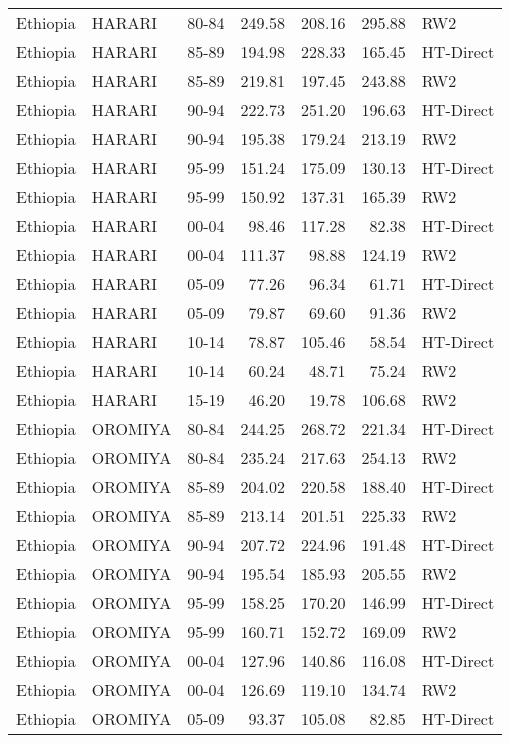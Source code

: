 \begin{longtable}{lllrrrl}
  Ethiopia & HARARI & 80-84 & 249.58 & 208.16 & 295.88 & RW2 \\ 
  Ethiopia & HARARI & 85-89 & 194.98 & 228.33 & 165.45 & HT-Direct \\ 
  Ethiopia & HARARI & 85-89 & 219.81 & 197.45 & 243.88 & RW2 \\ 
  Ethiopia & HARARI & 90-94 & 222.73 & 251.20 & 196.63 & HT-Direct \\ 
  Ethiopia & HARARI & 90-94 & 195.38 & 179.24 & 213.19 & RW2 \\ 
  Ethiopia & HARARI & 95-99 & 151.24 & 175.09 & 130.13 & HT-Direct \\ 
  Ethiopia & HARARI & 95-99 & 150.92 & 137.31 & 165.39 & RW2 \\ 
  Ethiopia & HARARI & 00-04 & 98.46 & 117.28 & 82.38 & HT-Direct \\ 
  Ethiopia & HARARI & 00-04 & 111.37 & 98.88 & 124.19 & RW2 \\ 
  Ethiopia & HARARI & 05-09 & 77.26 & 96.34 & 61.71 & HT-Direct \\ 
  Ethiopia & HARARI & 05-09 & 79.87 & 69.60 & 91.36 & RW2 \\ 
  Ethiopia & HARARI & 10-14 & 78.87 & 105.46 & 58.54 & HT-Direct \\ 
  Ethiopia & HARARI & 10-14 & 60.24 & 48.71 & 75.24 & RW2 \\ 
  Ethiopia & HARARI & 15-19 & 46.20 & 19.78 & 106.68 & RW2 \\ 
  Ethiopia & OROMIYA & 80-84 & 244.25 & 268.72 & 221.34 & HT-Direct \\ 
  Ethiopia & OROMIYA & 80-84 & 235.24 & 217.63 & 254.13 & RW2 \\ 
  Ethiopia & OROMIYA & 85-89 & 204.02 & 220.58 & 188.40 & HT-Direct \\ 
  Ethiopia & OROMIYA & 85-89 & 213.14 & 201.51 & 225.33 & RW2 \\ 
  Ethiopia & OROMIYA & 90-94 & 207.72 & 224.96 & 191.48 & HT-Direct \\ 
  Ethiopia & OROMIYA & 90-94 & 195.54 & 185.93 & 205.55 & RW2 \\ 
  Ethiopia & OROMIYA & 95-99 & 158.25 & 170.20 & 146.99 & HT-Direct \\ 
  Ethiopia & OROMIYA & 95-99 & 160.71 & 152.72 & 169.09 & RW2 \\ 
  Ethiopia & OROMIYA & 00-04 & 127.96 & 140.86 & 116.08 & HT-Direct \\ 
  Ethiopia & OROMIYA & 00-04 & 126.69 & 119.10 & 134.74 & RW2 \\ 
  Ethiopia & OROMIYA & 05-09 & 93.37 & 105.08 & 82.85 & HT-Direct \\ 

\end{longtable}
